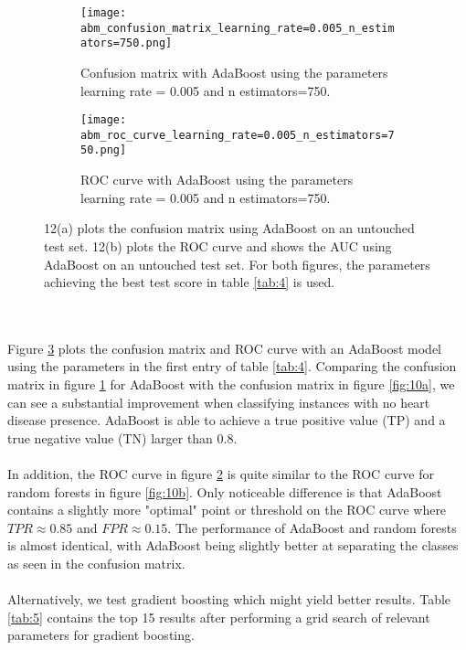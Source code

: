 \documentclass[a4paper,twocolumn]{article}
\begin{document}
\begin{figure}[!ht]
    \centering
    \begin{subfigure}[b]{\columnwidth}
        \texttt{[image: abm\_confusion\_matrix\_learning\_rate=0.005\_n\_estimators=750.png]}
        \caption{Confusion matrix with AdaBoost using the parameters learning rate = 0.005 and n estimators=750.}
        \label{fig:12a}
    \end{subfigure}
    
    \begin{subfigure}[b]{\columnwidth}
        \texttt{[image: abm\_roc\_curve\_learning\_rate=0.005\_n\_estimators=750.png]}
        \caption{ROC curve with AdaBoost using the parameters learning rate = 0.005 and n estimators=750.}
        \label{fig:12b}
    \end{subfigure}
    \caption{12(a) plots the confusion matrix using AdaBoost on an untouched test set. 12(b) plots the ROC curve and shows the AUC using AdaBoost on an untouched test set. For both figures, the parameters achieving the best test score in table \ref{tab:4} is used.}
    \label{fig:12}
\end{figure}\\
\\
Figure \ref{fig:12} plots the confusion matrix and ROC curve with an AdaBoost model using the parameters in the first entry of table \ref{tab:4}. Comparing the confusion matrix in figure \ref{fig:12a} for AdaBoost with the confusion matrix in figure \ref{fig:10a}, we can see a substantial improvement when classifying instances with no heart disease presence. AdaBoost is able to achieve a true positive value (TP) and a true negative value (TN) larger than $0.8$.\\
\\
In addition, the ROC curve in figure \ref{fig:12b} is quite similar to the ROC curve for random forests in figure \ref{fig:10b}. Only noticeable difference is that AdaBoost contains a slightly more "optimal" point or threshold on the ROC curve where $TPR \approx 0.85$ and $FPR \approx 0.15$. The performance of AdaBoost and random forests is almost identical, with AdaBoost being slightly better at separating the classes as seen in the confusion matrix.\\
\\
Alternatively, we test gradient boosting which might yield better results. Table \ref{tab:5} contains the top 15 results after performing a grid search of relevant parameters for gradient boosting.
\end{document}
